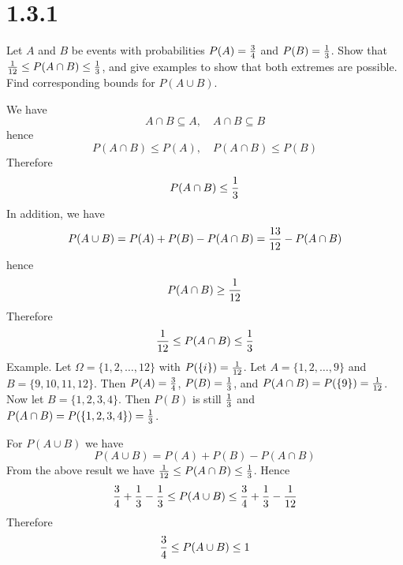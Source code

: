 \section*{1.3.1}
Let $A$ and $B$ be events with probabilities $P(A)={3\over4}$ and $P(B)={1\over3}$.
Show that ${1\over12}\le P(A\cap B)\le {1\over3}$, and give examples to show that
both extremes are possible. Find corresponding bounds for $P(A\cup B)$.

\bigskip
\noindent
We have
$$A\cap B\subseteq A,\quad A\cap B\subseteq B$$
hence
$$P(A\cap B)\le P(A),\quad P(A\cap B)\le P(B)$$
Therefore
$$P(A\cap B)\le{1\over3}$$
In addition, we have
$$P(A\cup B)=P(A)+P(B)-P(A\cap B)={13\over12}-P(A\cap B)$$
hence
$$P(A\cap B)\ge{1\over12}$$
Therefore
$${1\over12}\le P(A\cap B)\le {1\over3}$$
Example. Let $\Omega=\{1,2,\ldots,12\}$ with $P(\{i\})={1\over12}$.
Let $A=\{1,2,\ldots,9\}$ and $B=\{9,10,11,12\}$.
Then $P(A)={3\over4}$, $P(B)={1\over3}$, and $P(A\cap B)=P(\{9\})={1\over12}$.
Now let $B=\{1,2,3,4\}$.
Then $P(B)$ is still ${1\over3}$ and $P(A\cap B)=P(\{1,2,3,4\})={1\over3}$.

\bigskip
\noindent
For $P(A\cup B)$ we have
$$P(A\cup B)=P(A)+P(B)-P(A\cap B)$$
From the above result we have ${1\over12}\le P(A\cap B)\le {1\over 3}$. Hence
$${3\over4}+{1\over3}-{1\over3}\le P(A\cup B)\le{3\over4}+{1\over3}-{1\over12}$$
Therefore
$${3\over4}\le P(A\cup B)\le1$$
